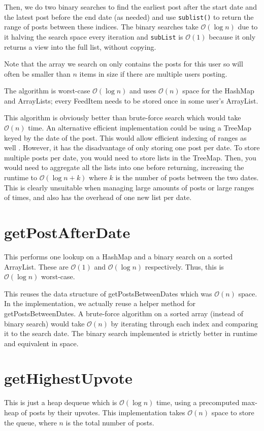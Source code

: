 \documentclass[11pt,a4paper]{article} %
\begin{document}
Then, we do two binary searches to find the earliest post after 
the start date and the latest post before the end date (as needed)
and use \verb|sublist()| to return the range of posts between these indices.
The binary searches take $\mathcal O(\log n)$ due to it halving the search space 
every iteration and \verb|subList| is $\mathcal O(1)$ because it only returns a view
into the full list, without copying.

Note that the array we search on only contains the posts for this user so will often 
be smaller than $n$ items in size if there are multiple users posting.

The algorithm is worst-case $\mathcal O(\log n)$
and uses $\mathcal O(n)$ space for the HashMap and ArrayLists; 
every FeedItem needs to be stored once in some user's ArrayList. 

This algorithm is obviously better than brute-force search which 
would take $\mathcal O(n)$ time. 
An alternative efficient implementation could be using a 
TreeMap keyed by the date of the post. This would allow efficient 
indexing of ranges as well \cite{treemap}. However, it has 
the disadvantage of only storing one post per date. To store multiple posts 
per date, you would need to store lists in the TreeMap. Then, you would need 
to aggregate all the lists into one before returning, increasing the runtime to 
$\mathcal O(\log n + k)$ where $k$ is the number of posts between the two dates. 
This is clearly unsuitable when managing large amounts of posts or large ranges of 
times, and also has the overhead of one new list per date.

\section*{getPostAfterDate}
This performs one lookup on a HashMap and a binary search on a sorted ArrayList.
These are $\mathcal O(1)$ and $\mathcal O(\log n)$ respectively.
Thus, this is $\mathcal O(\log n)$ worst-case.

This reuses the data structure of getPostsBetweenDates which was $\mathcal O(n)$
space. In the implementation, we actually reuse a helper method for getPostsBetweenDates.
A brute-force algorithm on a sorted array (instead of binary search) would take $\mathcal O(n)$
by iterating through each index and comparing it to the search date. The binary 
search implemented is strictly better in runtime and equivalent in space.

\section*{getHighestUpvote}
This is just a heap dequeue which is $\mathcal O(\log n)$ time,
using a precomputed max-heap of posts by their upvotes. 
This implementation takes $\mathcal O(n)$ space to store the queue,
where $n$ is the total number of posts. 
\end{document}
